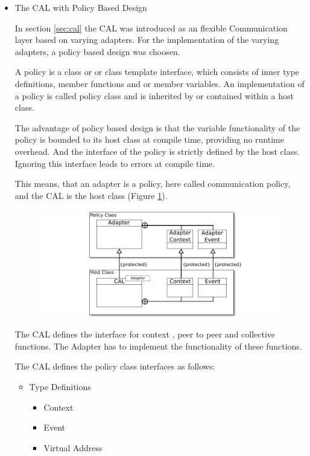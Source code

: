 \begin{itemize}

\item The CAL with Policy Based Design

  In section \ref{sec:cal} the CAL was introduced as an flexible
  Communication layer based on varying adapters. For the implementation
  of the varying adapters, a policy based design was choosen.

  A policy is a class or or class template interface, which consists of
  inner type definitions, member functions and or member variables. An
  implementation of a policy is called policy class and is inherited
  by or contained within a host class.

  The advantage of policy based design is that the variable
  functionality of the policy is bounded to its host class at compile
  time, providing no runtime overhead. And the interface of the policy
  is strictly defined by the host class. Ignoring this interface leads
  to errors at compile time.

  This means, that an adapter is a policy, here called communication
  policy, and the CAL is the host class (Figure \ref{fig:cal_uml}).

  \begin{figure}[H]
    \centering \includegraphics[width=\textwidth]{graphics/40_cal_uml}
    \caption{  }
    \label{fig:cal_uml}
  \end{figure}



  The CAL defines the interface for context , peer to peer
  and collective functions. The Adapter has to implement the
  functionality of these functions.



  The CAL defines the policy class interfaces as follows:

  \begin{itemize}
    \item Type Definitions
      \begin{itemize}
      \item Context 
      \item Event
      \item Virtual Address
      \end{itemize}


\end{itemize}
\end{itemize}
